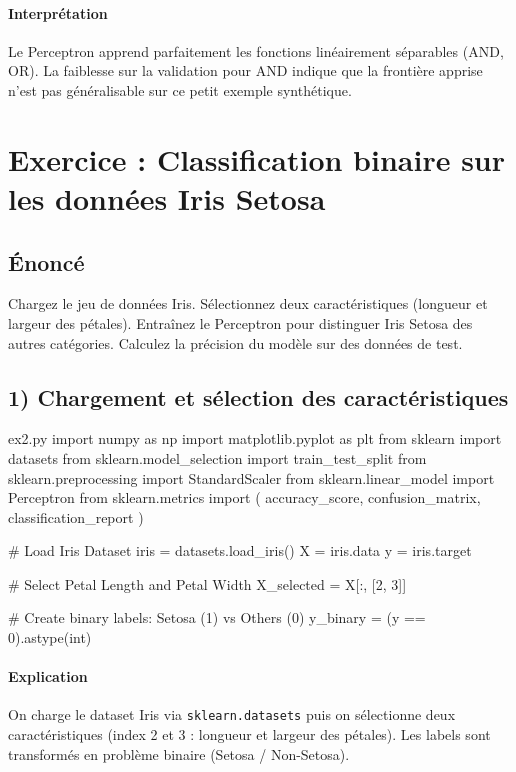 \documentclass[12pt,a4paper]{article}
\newcommand{\exercice}[1]{
    \clearpage
    \section{Exercice : #1}
}
\begin{document}
\paragraph{Interprétation}
Le Perceptron apprend parfaitement les fonctions linéairement séparables
(AND, OR). La faiblesse sur la validation pour AND indique que la frontière
apprise n'est pas généralisable sur ce petit exemple synthétique.


\exercice{Classification binaire sur les données Iris Setosa}

\subsection*{Énoncé}
Chargez le jeu de données Iris. Sélectionnez deux caractéristiques
(longueur et largeur des pétales). Entraînez le Perceptron pour distinguer
Iris Setosa des autres catégories.
Calculez la précision du modèle sur des données de test.

\subsection*{1) Chargement et sélection des caractéristiques}

\begin{codeholder}{ex2.py}
import numpy as np
import matplotlib.pyplot as plt
from sklearn import datasets
from sklearn.model_selection import train_test_split
from sklearn.preprocessing import StandardScaler
from sklearn.linear_model import Perceptron
from sklearn.metrics import (
    accuracy_score, confusion_matrix, classification_report
)

# Load Iris Dataset
iris = datasets.load_iris()
X    = iris.data
y    = iris.target

# Select Petal Length and Petal Width
X_selected = X[:, [2, 3]]

# Create binary labels: Setosa (1) vs Others (0)
y_binary = (y == 0).astype(int)
\end{codeholder}

\paragraph{Explication}
On charge le dataset Iris via \texttt{sklearn.datasets} puis on sélectionne
deux caractéristiques (index 2 et 3 : longueur et largeur des pétales).
Les labels sont transformés en problème binaire (Setosa / Non-Setosa).
\end{document}
